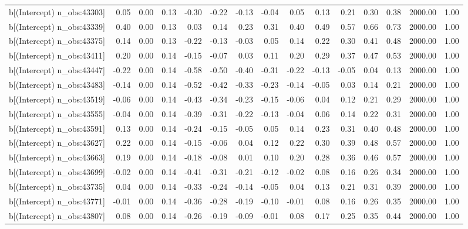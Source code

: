 \begin{table}[ht]
\begin{tabular}{rrrrrrrrrrrrrrr}
  b[(Intercept) n\_obs:43303] & 0.05 & 0.00 & 0.13 & -0.30 & -0.22 & -0.13 & -0.04 & 0.05 & 0.13 & 0.21 & 0.30 & 0.38 & 2000.00 & 1.00 \\ 
  b[(Intercept) n\_obs:43339] & 0.40 & 0.00 & 0.13 & 0.03 & 0.14 & 0.23 & 0.31 & 0.40 & 0.49 & 0.57 & 0.66 & 0.73 & 2000.00 & 1.00 \\ 
  b[(Intercept) n\_obs:43375] & 0.14 & 0.00 & 0.13 & -0.22 & -0.13 & -0.03 & 0.05 & 0.14 & 0.22 & 0.30 & 0.41 & 0.48 & 2000.00 & 1.00 \\ 
  b[(Intercept) n\_obs:43411] & 0.20 & 0.00 & 0.14 & -0.15 & -0.07 & 0.03 & 0.11 & 0.20 & 0.29 & 0.37 & 0.47 & 0.53 & 2000.00 & 1.00 \\ 
  b[(Intercept) n\_obs:43447] & -0.22 & 0.00 & 0.14 & -0.58 & -0.50 & -0.40 & -0.31 & -0.22 & -0.13 & -0.05 & 0.04 & 0.13 & 2000.00 & 1.00 \\ 
  b[(Intercept) n\_obs:43483] & -0.14 & 0.00 & 0.14 & -0.52 & -0.42 & -0.33 & -0.23 & -0.14 & -0.05 & 0.03 & 0.14 & 0.21 & 2000.00 & 1.00 \\ 
  b[(Intercept) n\_obs:43519] & -0.06 & 0.00 & 0.14 & -0.43 & -0.34 & -0.23 & -0.15 & -0.06 & 0.04 & 0.12 & 0.21 & 0.29 & 2000.00 & 1.00 \\ 
  b[(Intercept) n\_obs:43555] & -0.04 & 0.00 & 0.14 & -0.39 & -0.31 & -0.22 & -0.13 & -0.04 & 0.06 & 0.14 & 0.22 & 0.31 & 2000.00 & 1.00 \\ 
  b[(Intercept) n\_obs:43591] & 0.13 & 0.00 & 0.14 & -0.24 & -0.15 & -0.05 & 0.05 & 0.14 & 0.23 & 0.31 & 0.40 & 0.48 & 2000.00 & 1.00 \\ 
  b[(Intercept) n\_obs:43627] & 0.22 & 0.00 & 0.14 & -0.15 & -0.06 & 0.04 & 0.12 & 0.22 & 0.30 & 0.39 & 0.48 & 0.57 & 2000.00 & 1.00 \\ 
  b[(Intercept) n\_obs:43663] & 0.19 & 0.00 & 0.14 & -0.18 & -0.08 & 0.01 & 0.10 & 0.20 & 0.28 & 0.36 & 0.46 & 0.57 & 2000.00 & 1.00 \\ 
  b[(Intercept) n\_obs:43699] & -0.02 & 0.00 & 0.14 & -0.41 & -0.31 & -0.21 & -0.12 & -0.02 & 0.08 & 0.16 & 0.26 & 0.34 & 2000.00 & 1.00 \\ 
  b[(Intercept) n\_obs:43735] & 0.04 & 0.00 & 0.14 & -0.33 & -0.24 & -0.14 & -0.05 & 0.04 & 0.13 & 0.21 & 0.31 & 0.39 & 2000.00 & 1.00 \\ 
  b[(Intercept) n\_obs:43771] & -0.01 & 0.00 & 0.14 & -0.36 & -0.28 & -0.19 & -0.10 & -0.01 & 0.08 & 0.16 & 0.26 & 0.35 & 2000.00 & 1.00 \\ 
  b[(Intercept) n\_obs:43807] & 0.08 & 0.00 & 0.14 & -0.26 & -0.19 & -0.09 & -0.01 & 0.08 & 0.17 & 0.25 & 0.35 & 0.44 & 2000.00 & 1.00 \\ 

\end{tabular}
\end{table}

